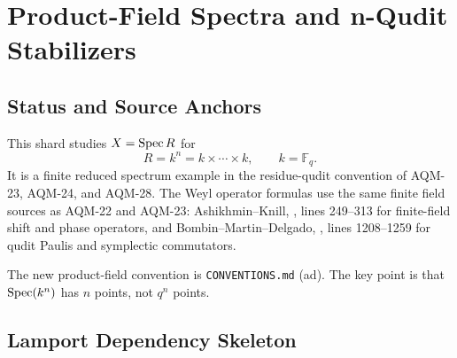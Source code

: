 
\section{Product-Field Spectra and n-Qudit Stabilizers}
\label{sec:product-field-spectrum-qudit-stabilizers}

\subsection{Status and Source Anchors}

This shard studies \(X=\operatorname{Spec} R\) for
\[
  R=k^n=k\times\cdots\times k,\qquad k=\mathbb F_q.
\]
It is a finite reduced spectrum example in the residue-qudit convention of
AQM-23, AQM-24, and AQM-28.  The Weyl operator formulas use the same finite
field sources as AQM-22 and AQM-23: Ashikhmin--Knill,
,
lines 249--313 for finite-field shift and phase operators, and
Bombin--Martin--Delgado,
,
lines 1208--1259 for qudit Paulis and symplectic commutators.

The new product-field convention is \texttt{CONVENTIONS.md} (ad).  The key
point is that \(\operatorname{Spec}(k^n)\) has \(n\) points, not \(q^n\) points.

\subsection{Lamport Dependency Skeleton}

